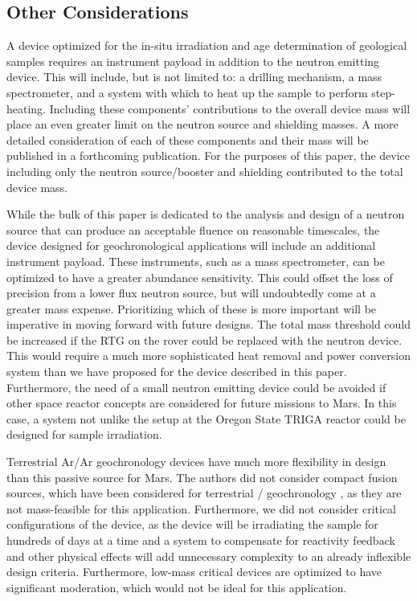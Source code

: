 \documentclass{mc2015}
\begin{document}
\subsection{Other Considerations}
\label{sec:others}

A device optimized for the in-situ irradiation and age determination of geological samples requires an instrument payload in addition to the neutron emitting device. This will include, but is not limited to: a drilling mechanism, a mass spectrometer, and a system with which to heat up the sample to perform step-heating. Including these components' contributions to the overall device mass will place an even greater limit on the neutron source and shielding masses. A more detailed consideration of each of these components and their mass will be published in a forthcoming publication. For the purposes of this paper, the device including only the neutron source/booster and shielding contributed to the total device mass. 

While the bulk of this paper is dedicated to the analysis and design of a neutron source that can produce an acceptable fluence on reasonable timescales, the device designed for geochronological applications will include an additional instrument payload. These instruments, such as a mass spectrometer, can be optimized to have a greater abundance sensitivity. This could offset the loss of precision from a lower flux neutron source, but will undoubtedly come at a greater mass expense. Prioritizing which of these is more important will be imperative in moving forward with future designs. The total mass threshold could be increased if the RTG on the rover could be replaced with the neutron device. This would require a much more sophisticated heat removal and power conversion system than we have proposed for the device described in this paper. Furthermore, the need of a small neutron emitting device could be avoided if other space reactor concepts are considered for future missions to Mars. In this case, a system not unlike the setup at the Oregon State TRIGA reactor could be designed for sample irradiation.

Terrestrial Ar/Ar geochronology devices have much more flexibility in design than this passive source for Mars. The authors did not consider compact fusion sources, which have been considered for terrestrial / geochronology \cite{renne_application_2005}, as they are not mass-feasible for this application. Furthermore, we did not consider critical configurations of the device, as the device will be irradiating the sample for hundreds of days at a time and a system to compensate for reactivity feedback and other physical effects will add unnecessary complexity to an already inflexible design criteria. Furthermore, low-mass critical devices are optimized to have significant moderation, which would not be ideal for this application. 
\end{document}

